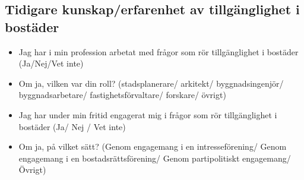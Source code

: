 \documentclass[]{tufte-handout}
\providecommand{\tightlist}{%
  \setlength{\itemsep}{0pt}\setlength{\parskip}{0pt}}
\begin{document}
\hypertarget{tidigare-kunskaperfarenhet-av-tillguxe4nglighet-i-bostuxe4der}{%
\subsection{Tidigare kunskap/erfarenhet av tillgänglighet i
bostäder}\label{tidigare-kunskaperfarenhet-av-tillguxe4nglighet-i-bostuxe4der}}

\begin{itemize}
\tightlist
\item
  Jag har i min profession arbetat med frågor som rör tillgänglighet i
  bostäder (Ja/Nej/Vet inte)
\item
  Om ja, vilken var din roll? (stadsplanerare/ arkitekt/
  byggnadsingenjör/ byggnadsarbetare/ fastighetsförvaltare/ forskare/
  övrigt)
\item
  Jag har under min fritid engagerat mig i frågor som rör tillgänglighet
  i bostäder (Ja/ Nej / Vet inte)
\item
  Om ja, på vilket sätt? (Genom engagemang i en intresseförening/ Genom
  engagemang i en bostadsrättsförening/ Genom partipolitiskt engagemang/
  Övrigt)
\end{itemize}


\end{document}
